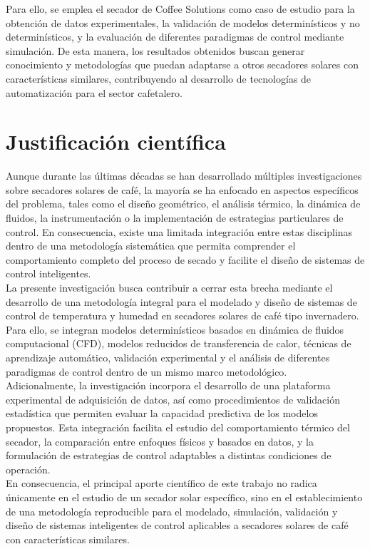Para ello, se emplea el secador de Coffee Solutions como caso de estudio para la obtención de datos experimentales, la validación de modelos determinísticos y no determinísticos, y la evaluación de diferentes paradigmas de control mediante simulación. De esta manera, los resultados obtenidos buscan generar conocimiento y metodologías que puedan adaptarse a otros secadores solares con características similares, contribuyendo al desarrollo de tecnologías de automatización para el sector cafetalero.\\


\section{Justificación científica}
Aunque durante las últimas décadas se han desarrollado múltiples investigaciones sobre secadores solares de café, la mayoría se ha enfocado en aspectos específicos del problema, tales como el diseño geométrico, el análisis térmico, la dinámica de fluidos, la instrumentación o la implementación de estrategias particulares de control. En consecuencia, existe una limitada integración entre estas disciplinas dentro de una metodología sistemática que permita comprender el comportamiento completo del proceso de secado y facilite el diseño de sistemas de control inteligentes.\\

La presente investigación busca contribuir a cerrar esta brecha mediante el desarrollo de una metodología integral para el modelado y diseño de sistemas de control de temperatura y humedad en secadores solares de café tipo invernadero. Para ello, se integran modelos determinísticos basados en dinámica de fluidos computacional (CFD), modelos reducidos de transferencia de calor, técnicas de aprendizaje automático, validación experimental y el análisis de diferentes paradigmas de control dentro de un mismo marco metodológico.\\

Adicionalmente, la investigación incorpora el desarrollo de una plataforma experimental de adquisición de datos, así como procedimientos de validación estadística que permiten evaluar la capacidad predictiva de los modelos propuestos. Esta integración facilita el estudio del comportamiento térmico del secador, la comparación entre enfoques físicos y basados en datos, y la formulación de estrategias de control adaptables a distintas condiciones de operación.\\

En consecuencia, el principal aporte científico de este trabajo no radica únicamente en el estudio de un secador solar específico, sino en el establecimiento de una metodología reproducible para el modelado, simulación, validación y diseño de sistemas inteligentes de control aplicables a secadores solares de café con características similares.


